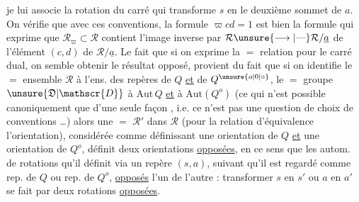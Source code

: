 je lui associe la rotation du carré qui transforme $s$ en le deuxième sommet de $a$. On vérifie que avec ces conventions, la formule $\varpi c d=1$ est bien la formule qui exprime que $\mathcal{R}_{\varpi}\subset \mathcal{R}$ contient l'image inverse par $\mathcal{R}\unsure{\longrightarrow|\text{---}}\mathcal{R}/\underline a$ de l'élément $(c,d)$ de $\mathcal{R}/\underline a$. Le fait que si on exprime la $=$ relation pour le carré dual, on semble obtenir le résultat opposé, provient du fait que si on identifie le $=$ ensemble $\mathcal{R}$ à l'ens. des repères de $Q$ \uline{et} de $Q^{\unsure{o|0|\circ}}$,    le $=$ groupe $\unsure{\mathfrak{D}|\mathscr{D}}$ à $\mathrm{Aut}\,Q$ \uline{et} à $\mathrm{Aut}(Q^o)$ (ce qui n'est possible canoniquement que d'une seule façon , i.e. ce n'est pas une question de choix de conventions \ldots) alors une $=$   $\mathcal{R}'$ dans $\mathcal{R}$  (pour la relation d'équivalence  l'orientation), considérée comme définissant une orientation de $Q$ \uline{et} une orientation de $Q^o$, définit deux orientations \uline{opposées}, en ce sens que les autom. de rotations qu'il définit via un repère $(s,a)$, suivant qu'il est regardé comme rep. de $Q$ ou rep. de $Q^o$,  \uline{opposés} l'un de l'autre : transformer $s$ en $s'$ ou $a$ en $a'$ se fait par deux rotations \uline{opposées}.
